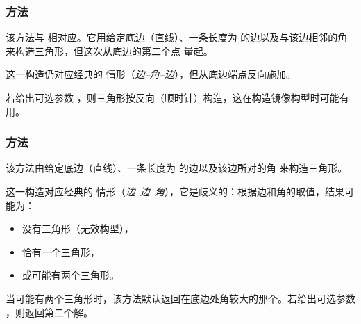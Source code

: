 \subsubsection{方法 }
\label{ssub:_line__as_d_an_swap}

该方法与  相对应。它用给定底边（直线）、一条长度为  的边以及与该边相邻的角  来构造三角形，但这次从底边的第二个点  量起。

\medskip

这一构造仍对应经典的  情形（\textit{边–角–边}），但从底边端点反向施加。

\medskip

若给出可选参数 ，则三角形按反向（顺时针）构造，这在构造镜像构型时可能有用。


\subsubsection{方法 }
\label{ssub:_line_sa}

该方法由给定底边（直线）、一条长度为  的边以及该边所对的角  来构造三角形。

\medskip

这一构造对应经典的  情形（\emph{边–边–角}），它是歧义的：根据边和角的取值，结果可能为：

\begin{itemize}
  \item 没有三角形（无效构型），
  \item 恰有一个三角形，
  \item 或可能有两个三角形。
\end{itemize}

\medskip

当可能有两个三角形时，该方法默认返回在底边处角较大的那个。若给出可选参数 ，则返回第二个解。

\vspace{1em}

\begin{center}
\end{center}

